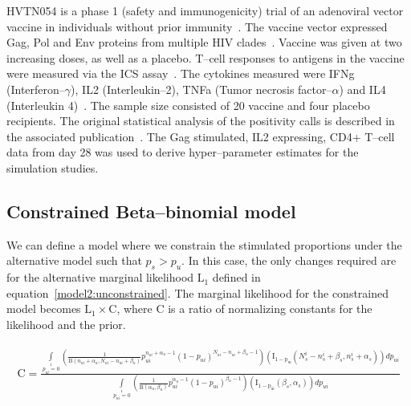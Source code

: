 \documentclass[11pt]{article}
\begin{document}
HVTN054 is a phase 1 (safety and immunogenicity) trial of an adenoviral vector vaccine in individuals without prior immunity~\cite{Peiperl:2010ej}. The vaccine vector expressed Gag, Pol and Env proteins from multiple HIV clades~\cite{Peiperl:2010ej}. Vaccine was given at two increasing doses, as well as a placebo. T--cell responses to antigens in the vaccine were measured via the ICS assay~\cite{Peiperl:2010ej,Horton:2007tsa}. The cytokines measured were IFNg (Interferon--$\gamma$), IL2 (Interleukin--2), TNFa (Tumor necrosis factor--$\alpha$) and IL4 (Interleukin 4)~\cite{Horton:2007tsa}. The sample size consisted of 20 vaccine and four placebo recipients. The original statistical analysis of the positivity calls is described in the associated publication~\cite{Peiperl:2010ej}. The Gag stimulated, IL2 expressing, CD4+ T--cell data from day 28 was used to derive hyper--parameter estimates for the simulation studies. 

\subsection{Constrained Beta--binomial model}
\label{supp:constrained}
We can define a model where we constrain the stimulated proportions under the alternative model such that $p_s>p_u$. In this case, the only changes required are for the alternative marginal likelihood $\mathrm{L}_1$ defined in equation~\eqref{model2:unconstrained}. The marginal likelihood for the constrained model becomes $\mathrm{L}_1\times \mathrm{C}$, where $\mathrm{C}$ is a ratio of normalizing constants for the likelihood and the prior.

\begin{align}
\begin{split}
	 \mathrm{C}=\frac{\int\limits_{p_{ui}=0}\limits^{1}\left(\frac{1}{\mathrm{B}(n_{ui}+\alpha_u,N_{ui}-n_{ui}+\beta_u)}p_{ui}^{n_{ui}+\alpha_u-1}(1-p_{ui})^{N_{ui}-n_{ui}+\beta_u-1} \right)\left(\mathrm{I_{1-p_{ui}}}(N^i_s-n^i_s+\beta_s,n^i_s+\alpha_s)\right)d p_{ui}}{   \int\limits_{p_{ui}=0}\limits^{1}\left(\frac{1}{\mathrm{B}(\alpha_u,\beta_u)}p_{ui}^{\alpha_u-1}(1-p_{ui})^{\beta_u-1} \right)\left(\mathrm{I_{1-p_{ui}}}(\beta_s,\alpha_s)\right)d p_{ui}}
\label{eq:model2post}
\end{split}
\end{align}
 
\end{document}
